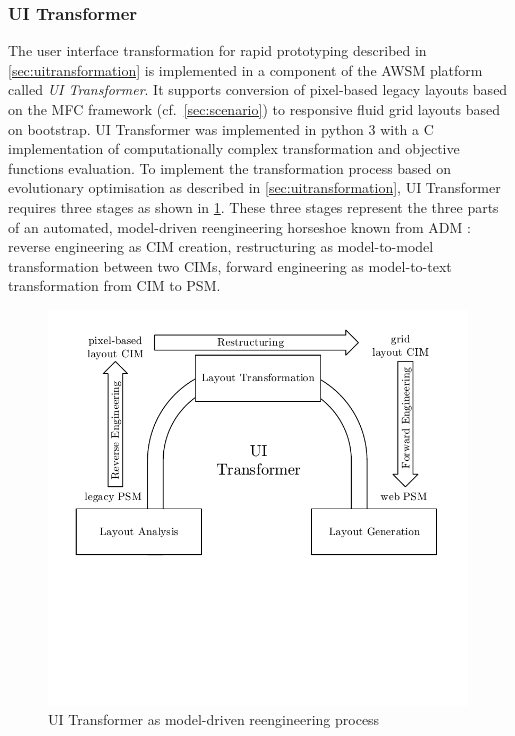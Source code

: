 
\hypertarget{sec:uitransformation.impl}{%
\subsubsection{UI Transformer}\label{sec:uitransformation.impl}}

The user interface transformation for rapid prototyping described in \cref{sec:uitransformation} is implemented in a component of the AWSM platform called \emph{UI Transformer}.
It supports conversion of pixel-based legacy layouts based on the MFC framework (cf.~\cref{sec:scenario}) to responsive fluid grid layouts based on bootstrap.
UI Transformer was implemented in python 3 with a C implementation of computationally complex transformation and objective functions evaluation.
To implement the transformation process based on evolutionary optimisation as described in \cref{sec:uitransformation}, UI Transformer requires three stages as shown in \cref{fig:awsm.rm.uitransformer.horseshoe}.
These three stages represent the three parts of an automated, model-driven reengineering horseshoe known from ADM \autocite{Perez-Castillo2011MARBLE}: reverse engineering as CIM creation, restructuring as model-to-model transformation between two CIMs, forward engineering as model-to-text transformation from CIM to PSM.

\begin{figure}
\hypertarget{fig:awsm.rm.uitransformer.horseshoe}{%
\centering
\includegraphics[width=0.99\textwidth]{../figures/awsm-rm-ui-transformation-horseshoe.pdf}
\caption{UI Transformer as model-driven reengineering process}\label{fig:awsm.rm.uitransformer.horseshoe}
}
\end{figure}

